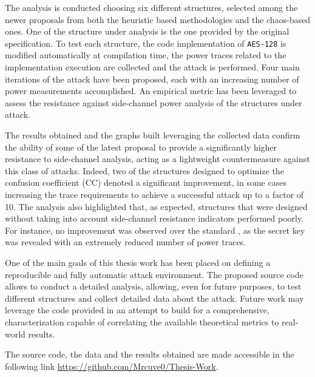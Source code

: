     The analysis is conducted choosing six different \sbocs{} structures, selected among the newer proposals from both the heuristic based methodologies and the chaos-based ones. One of the structure under analysis is the one provided by the original \aes{} specification. To test each structure, the code implementation of \texttt{AES-128} is modified automatically at compilation time, the power traces related to the implementation execution are collected and the attack is performed. Four main iterations of the attack have been proposed, each with an increasing number of power measurements accomplished. An empirical metric has been leveraged to assess the resistance against side-channel power analysis of the structures under attack.
    
    The results obtained and the graphs built leveraging the collected data confirm the ability of some of the latest \sbocs{} proposal to provide a significantly higher resistance to side-channel analysis, acting as a lightweight countermeasure against this class of attacks. Indeed, two of the structures designed to optimize the confusion coefficient (CC) denoted a significant improvement, in some cases increasing the trace requirements to achieve a successful attack up to a factor of 10. The analysis also highlighted that, as expected, structures that were designed without taking into account side-channel resistance indicators performed poorly. For instance, no improvement was observed over the standard \aes{} \sbocs{}, as the secret key was revealed with an extremely reduced number of power traces.

    One of the main goals of this thesis work has been placed on defining a reproducible and fully automatic attack environment. The proposed source code allows to conduct a detailed analysis, allowing, even for future purposes, to test different \sbocs{} structures and collect detailed data about the attack. Future work may leverage the code provided in an attempt to build for a comprehensive, characterization capable of correlating the available theoretical metrics to real-world results.
    
    The source code, the data and the results obtained are made accessible in the following link \url{https://github.com/Mrcuve0/Thesis-Work}.


